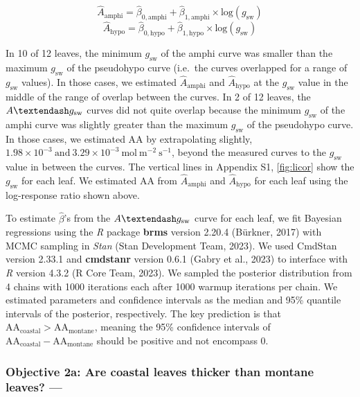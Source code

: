 \documentclass[
  letterpaper,
  DIV=11,
  numbers=noendperiod]{scrartcl}
\begin{document}
\[\hat{A}_\text{amphi} = \hat{\beta}_{0,\text{amphi}} + \hat{\beta}_{1,\text{amphi}} \times \text{log}(g_\mathrm{sw})\]
\[\hat{A}_\text{hypo} = \hat{\beta}_{0,\text{hypo}} + \hat{\beta}_{1,\text{hypo}} \times \text{log}(g_\mathrm{sw})\]

In 10 of 12 leaves, the minimum \(g_\text{sw}\) of the amphi curve was
smaller than the maximum \(g_\text{sw}\) of the pseudohypo curve
(i.e.~the curves overlapped for a range of \(g_\text{sw}\) values). In
those cases, we estimated \(\hat{A}_\text{amphi}\) and
\(\hat{A}_\text{hypo}\) at the \(g_\mathrm{sw}\) value in the middle of
the range of overlap between the curves. In 2 of 12 leaves, the
\(A \textendash g_\text{sw}\) curves did not quite overlap because the
minimum \(g_\text{sw}\) of the amphi curve was slightly greater than the
maximum \(g_\text{sw}\) of the pseudohypo curve. In those cases, we
estimated \(\mathrm{AA}\) by extrapolating slightly,
\(1.98\times 10^{-3}~\text{and}~3.29\times 10^{-3}~\text{mol}~\text{m}^{-2}~\text{s}^{-1}\),
beyond the measured curves to the \(g_\mathrm{sw}\) value in between the
curves. The vertical lines in Appendix S1, \autoref{fig:licor} show the
\(g_\text{sw}\) for each leaf. We estimated \(\mathrm{AA}\) from
\(\hat{A}_\text{amphi}\) and \(\hat{A}_\text{hypo}\) for each leaf using
the log-response ratio shown above.

To estimate \(\hat{\beta}\)'s from the \(A \textendash g_\text{sw}\)
curve for each leaf, we fit Bayesian regressions using the \emph{R}
package \textbf{brms} version 2.20.4 (Bürkner, 2017) with MCMC sampling
in \emph{Stan} (Stan Development Team, 2023). We used CmdStan version
2.33.1 and \textbf{cmdstanr} version 0.6.1 (Gabry et al., 2023) to
interface with \emph{R} version 4.3.2 (R Core Team, 2023). We sampled
the posterior distribution from 4 chains with 1000 iterations each after
1000 warmup iterations per chain. We estimated parameters and confidence
intervals as the median and 95\% quantile intervals of the posterior,
respectively. The key prediction is that
\(\mathrm{AA}_\text{coastal} > \mathrm{AA}_\text{montane}\), meaning the
95\% confidence intervals of
\(\mathrm{AA}_\text{coastal} - \mathrm{AA}_\text{montane}\) should be
positive and not encompass 0.

\hypertarget{objective-2a-are-coastal-leaves-thicker-than-montane-leaves}{%
\subsubsection{Objective 2a: Are coastal leaves thicker than montane
leaves?
---}\label{objective-2a-are-coastal-leaves-thicker-than-montane-leaves}}
\end{document}
